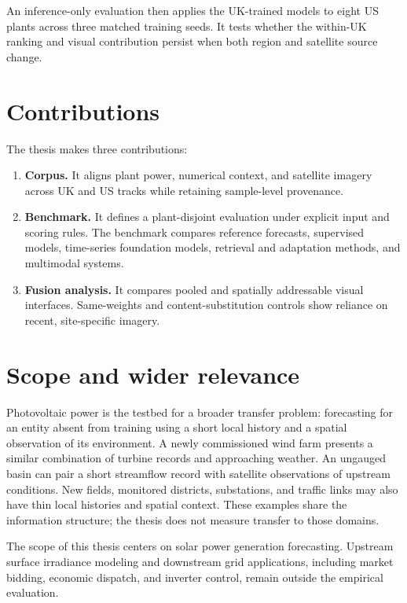 An inference-only evaluation then applies the UK-trained models to eight US plants across three matched training seeds. It tests whether the within-UK ranking and visual contribution persist when both region and satellite source change. 

\section{Contributions}

The thesis makes three contributions:

\begin{enumerate}
\item \textbf{Corpus.} It aligns plant power, numerical context, and satellite imagery across UK and US tracks while retaining sample-level provenance.
\item \textbf{Benchmark.} It defines a plant-disjoint evaluation under explicit input and scoring rules. The benchmark compares reference forecasts, supervised models, time-series foundation models, retrieval and adaptation methods, and multimodal systems.
\item \textbf{Fusion analysis.} It compares pooled and spatially addressable visual interfaces. Same-weights and content-substitution controls show reliance on recent, site-specific imagery.
\end{enumerate}

\section{Scope and wider relevance}

Photovoltaic power is the testbed for a broader transfer problem: forecasting for an entity absent from training using a short local history and a spatial observation of its environment. A newly commissioned wind farm presents a similar combination of turbine records and approaching weather. An ungauged basin can pair a short streamflow record with satellite observations of upstream conditions. New fields, monitored districts, substations, and traffic links may also have thin local histories and spatial context. These examples share the information structure; the thesis does not measure transfer to those domains.

The scope of this thesis centers on solar power generation forecasting. Upstream surface irradiance modeling and downstream grid applications, including market bidding, economic dispatch, and inverter control, remain outside the empirical evaluation.

